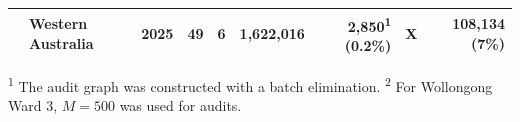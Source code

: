 \begin{table}[h]
{\begin{tabular}{@{}clrrrrrrr@{}}
& Western Australia
& 2025 & 49 & 6 & 1,622,016 & 2,850\textsuperscript{1} (0.2\%)
& X & 108,134 (7\%) \\
\hline

\end{tabular}%
}

\vspace{2pt}

\begin{minipage}{\textwidth}
\footnotesize
\textsuperscript{1} The audit graph was constructed with a batch elimination.\quad
\textsuperscript{2} For Wollongong Ward 3, \(M=500\) was used for audits.
\end{minipage}
\vspace{-12pt}
\end{table}

